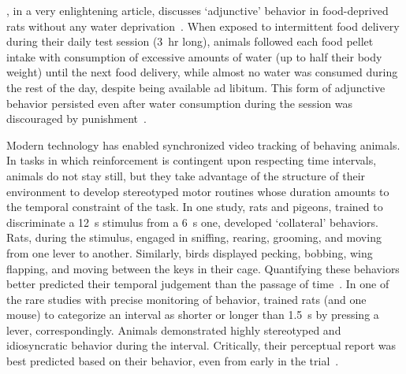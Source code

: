 , in a very enlightening article, discusses `adjunctive' behavior in food-deprived rats without any water deprivation~\cite{Falk1971}.
When exposed to intermittent food delivery during their daily test session (3~hr long), animals followed each food pellet intake with consumption of excessive amounts of water (up to half their body weight) until the next food delivery, while almost no water was consumed during the rest of the day, despite being available ad libitum.
This form of adjunctive behavior persisted even after water consumption during the session was discouraged by punishment~\cite{Falk1971}.\footnotemark
{}
\par
Modern technology has enabled synchronized video tracking of behaving animals.
In tasks in which reinforcement is contingent upon respecting time intervals, animals do not stay still, but they take advantage of the structure of their environment to develop stereotyped motor routines whose duration amounts to the temporal constraint of the task.
In one study, rats and pigeons, trained to discriminate a 12~s stimulus from a 6~s one, developed `collateral' behaviors.
Rats, during the stimulus, engaged in sniffing, rearing, grooming, and moving from one lever to another.
Similarly, birds displayed pecking, bobbing\footnotemark, wing flapping, and moving between the keys in their cage.
Quantifying these behaviors better predicted their temporal judgement than the passage of time~\cite{Fetterman1998BehProc}.
In one of the rare studies with precise monitoring of behavior, \citeauthor{Gouvea2014} trained rats (and one mouse) to categorize an interval as shorter or longer than 1.5~s by pressing a lever, correspondingly.
Animals demonstrated highly stereotyped and idiosyncratic behavior during the interval.
Critically, their perceptual report was best predicted based on their behavior, even from early in the trial~\cite{Gouvea2014}.
